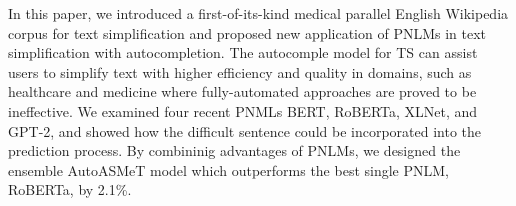 \documentclass[11pt]{article}
\begin{document}
In this paper, we introduced a first-of-its-kind medical parallel English Wikipedia corpus for text simplification and proposed new application of PNLMs in text simplification with autocompletion. The autocomple model for TS can assist users to simplify text with higher efficiency and quality in domains, such as healthcare and medicine where fully-automated approaches are proved to be ineffective. We examined four recent PNMLs BERT, RoBERTa, XLNet, and GPT-2, and showed how the difficult sentence could be incorporated into the prediction process. By combininig advantages of PNLMs, we designed the ensemble AutoASMeT model which outperforms the best single PNLM, RoBERTa, by 2.1\%.











\end{document}
